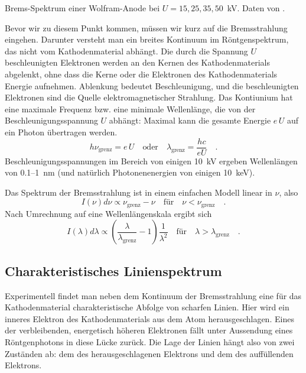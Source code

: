 \begin{marginfigure}
    \caption{Brems-Spektrum einer Wolfram-Anode bei $U= 15, 25, 35, 50$~kV. Daten von \cite{Gilfrich68}.}
    \label{fig:7_bremsstrahlung}
\end{marginfigure}

Bevor wir zu diesem Punkt kommen, müssen wir kurz auf die Bremsstrahlung eingehen. Darunter versteht man ein breites Kontinuum im Röntgenspektrum,  das nicht vom Kathodenmaterial abhängt. Die durch die Spannung $U$ beschleunigten Elektronen werden an den Kernen des Kathodenmaterials abgelenkt, ohne dass die Kerne oder die Elektronen des Kathodenmaterials Energie aufnehmen. Ablenkung bedeutet Beschleunigung, und die beschleunigten Elektronen sind die Quelle  elektromagnetischer Strahlung.  Das Kontiunium hat eine maximale Frequenz bzw. eine minimale Wellenlänge, die von der Beschleunigungsspannung $U$ abhängt: Maximal kann die gesamte Energie $e \, U$ auf ein Photon übertragen werden.
\begin{equation}
    h \nu_\text{grenz} = e \, U \quad \text{oder} \quad
    \lambda_\text{grenz} = \frac{h c}{e U} \quad .
\end{equation}
Beschleunigungsspannungen im Bereich von einigen 10~kV ergeben Wellenlängen von 0.1--1~nm (und natürlich Photonenenergien von einigen 10~keV).

Das Spektrum der Bremsstrahlung ist in einem einfachen Modell linear in $\nu$, also 
\begin{equation}
    I(\nu) d\nu \propto \nu_\text{grenz} - \nu \quad \text{für} \quad  \nu < \nu_\text{grenz} \quad .
\end{equation}
Nach Umrechnung auf eine Wellenlängenskala ergibt sich
\begin{equation}
    I(\lambda) d\lambda \propto \left( \frac{\lambda}{\lambda_\text{grenz}} - 1 \right) \frac{1}{\lambda^2} 
    \quad \text{für} \quad  \lambda > \lambda_\text{grenz} \quad .
\end{equation}




\subsection{Charakteristisches Linienspektrum}

Experimentell findet man neben dem Kontinuum der Bremsstrahlung eine für das Kathodenmaterial charakteristische Abfolge von scharfen Linien. Hier wird ein inneres Elektron des Kathodenmaterials aus dem Atom herausgeschlagen. Eines der verbleibenden, energetisch höheren Elektronen fällt unter Aussendung eines Röntgenphotons in diese Lücke zurück. Die Lage der Linien hängt also von zwei Zuständen ab: dem des herausgeschlagenen Elektrons und dem des auffüllenden Elektrons.

